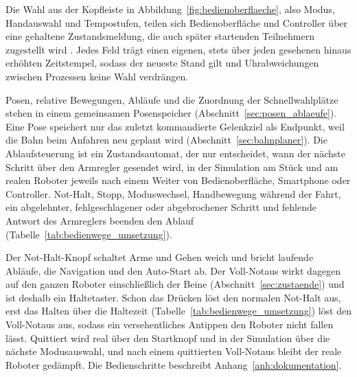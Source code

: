 Die Wahl aus der Kopfleiste in Abbildung~\ref{fig:bedienoberflaeche}, also Modus, Handauswahl und Tempostufen, teilen sich Bedienoberfläche und Controller über eine gehaltene Zustandsmeldung, die auch später startenden Teilnehmern zugestellt wird \cite{Macenski2022}.
Jedes Feld trägt einen eigenen, stets über jeden gesehenen hinaus erhöhten Zeitstempel, sodass der neueste Stand gilt und Uhrabweichungen zwischen Prozessen keine Wahl verdrängen.

Posen, relative Bewegungen, Abläufe und die Zuordnung der Schnellwahlplätze stehen in einem gemeinsamen Posenspeicher (Abschnitt~\ref{sec:posen_ablaeufe}).
Eine Pose speichert nur das zuletzt kommandierte Gelenkziel als Endpunkt, weil die Bahn beim Anfahren neu geplant wird (Abschnitt~\ref{sec:bahnplaner}).
Die Ablaufsteuerung ist ein Zustandsautomat, der nur entscheidet, wann der nächste Schritt über den Armregler gesendet wird, in der Simulation am Stück und am realen Roboter jeweils nach einem Weiter von Bedienoberfläche, Smartphone oder Controller.
Not-Halt, Stopp, Moduswechsel, Handbewegung während der Fahrt, ein abgelehnter, fehlgeschlagener oder abgebrochener Schritt und fehlende Antwort des Armreglers beenden den Ablauf (Tabelle~\ref{tab:bedienwege_umsetzung}).

Der Not-Halt-Knopf schaltet Arme und Gehen weich und bricht laufende Abläufe, die Navigation und den Auto-Start ab.
Der Voll-Notaus wirkt dagegen auf den ganzen Roboter einschließlich der Beine (Abschnitt~\ref{sec:zustaende}) und ist deshalb ein Haltetaster.
Schon das Drücken löst den normalen Not-Halt aus, erst das Halten über die Haltezeit (Tabelle~\ref{tab:bedienwege_umsetzung}) löst den Voll-Notaus aus, sodass ein versehentliches Antippen den Roboter nicht fallen lässt.
Quittiert wird real über den Startknopf und in der Simulation über die nächste Modusauswahl, und nach einem quittierten Voll-Notaus bleibt der reale Roboter gedämpft.
Die Bedienschritte beschreibt Anhang~\ref{anh:dokumentation}.

